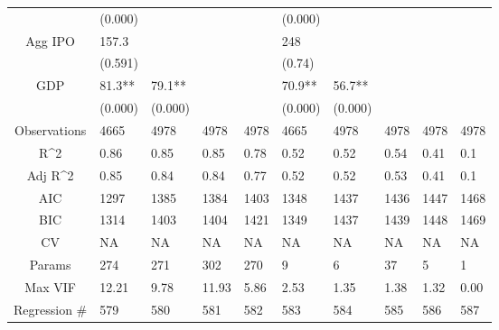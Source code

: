 \documentclass{article}
\begin{document}
\begin{table}[H]
\begin{tabular}{|clllllllll|}
   & (0.000) &  &  &  & (0.000) &  &  &  &  \\
  Agg IPO & 157.3 &  &  &  & 248 &  &  &  &  \\
   & (0.591) &  &  &  & (0.74) &  &  &  &  \\
  GDP & 81.3** & 79.1** &  &  & 70.9** & 56.7** &  &  &  \\
   & (0.000) & (0.000) &  &  & (0.000) & (0.000) &  &  &  \\
  \hline
 Observations & 4665 & 4978 & 4978 & 4978 & 4665 & 4978 & 4978 & 4978 & 4978 \\
  R^2 & 0.86 & 0.85 & 0.85 & 0.78 & 0.52 & 0.52 & 0.54 & 0.41 & 0.1 \\
  Adj R^2 & 0.85 & 0.84 & 0.84 & 0.77 & 0.52 & 0.52 & 0.53 & 0.41 & 0.1 \\
  AIC & 1297 & 1385 & 1384 & 1403 & 1348 & 1437 & 1436 & 1447 & 1468 \\
  BIC & 1314 & 1403 & 1404 & 1421 & 1349 & 1437 & 1439 & 1448 & 1469 \\
  CV & NA & NA & NA & NA & NA & NA & NA & NA & NA \\
  Params & 274 & 271 & 302 & 270 & 9 & 6 & 37 & 5 & 1 \\
  Max VIF & 12.21 & 9.78 & 11.93 & 5.86 & 2.53 & 1.35 & 1.38 & 1.32 & 0.00 \\
  Regression \# & 579 & 580 & 581 & 582 & 583 & 584 & 585 & 586 & 587 \\
   \hline
\end{tabular}

\end{table}
\end{document}
